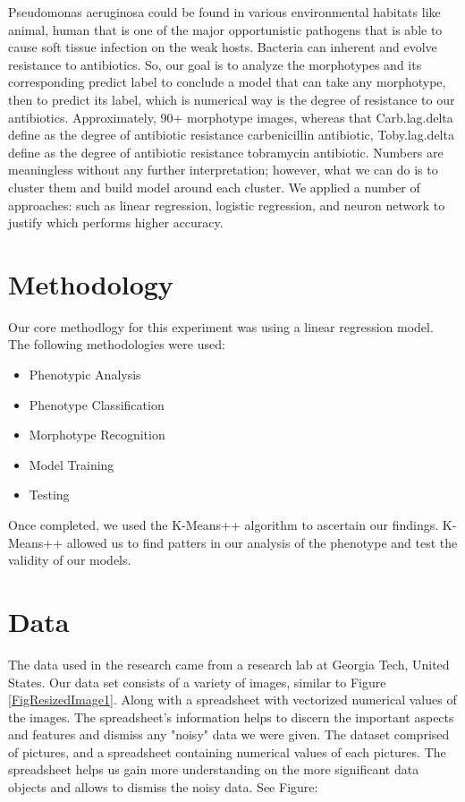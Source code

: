 \documentclass[conference]{IEEEtran}
\begin{document}
Pseudomonas aeruginosa could be found in various environmental habitats like animal, human that is one of the major opportunistic pathogens that is able to cause soft tissue infection on the weak hosts. Bacteria can inherent and evolve resistance to antibiotics. So, our goal is to analyze the morphotypes and its corresponding predict label to conclude a model that can take any morphotype, then to predict its label, which is numerical way is the degree of resistance to our antibiotics. Approximately, 90+ morphotype images, whereas that Carb.lag.delta define as the degree of antibiotic resistance carbenicillin antibiotic, Toby.lag.delta define as the degree of antibiotic resistance tobramycin antibiotic. Numbers are meaningless without any further interpretation; however, what we can do is to cluster them and build model around each cluster. We applied a number of approaches: such as linear regression, logistic regression, and neuron network to justify which performs higher accuracy. 

\section{Methodology}
Our core methodlogy for this experiment was using a linear regression model. The following methodologies were used:
\begin{itemize}
\item
Phenotypic Analysis
\item
Phenotype Classification
\item
Morphotype Recognition
\item
Model Training
\item
Testing
\end{itemize}
Once completed, we used the K-Means++ algorithm to ascertain our findings. K-Means++ allowed us to find patters in our analysis of the phenotype and test the validity of our models.


\section{Data}

The data used in the research came from a research lab at Georgia Tech, United States. Our data set consists of a variety of images, similar to Figure  \ref{FigResizedImage1}. Along with a spreadsheet with vectorized numerical values of the images. The spreadsheet's information helps to discern the important aspects and features and dismiss any "noisy" data we were given. The dataset comprised of pictures, and a spreadsheet containing numerical values of each pictures. The spreadsheet helps us gain more understanding on the more significant data objects and allows to dismiss the noisy data.  See Figure:
\end{document}
